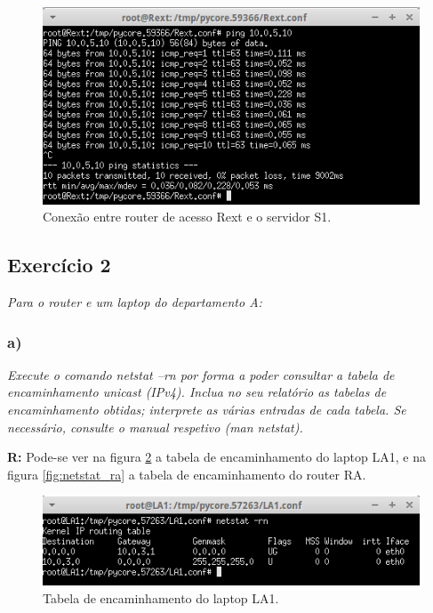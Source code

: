 \documentclass{llncs}
\begin{document}
\begin{figure}[H]
\begin{center}
\includegraphics[scale=0.50]{REXT_S1.png} 
\end{center}
\caption{\label{fig:rext_s1} Conexão entre router de acesso Rext e o servidor S1.}
\end{figure} 

\subsection{Exercício 2}
\emph{Para o router e um laptop do departamento A:}

\subsubsection{a)}
\emph{Execute o comando netstat –rn por forma a poder consultar a tabela de encaminhamento unicast (IPv4). Inclua no seu relatório as tabelas de encaminhamento obtidas; interprete as várias entradas de cada tabela. Se necessário, consulte o manual respetivo (man netstat). }
\\ \par
\textbf{R:} Pode-se ver na figura \ref{fig:netstat_la1} a tabela de encaminhamento do laptop LA1, e na figura \ref{fig:netstat_ra} a tabela de encaminhamento do router RA.

\begin{figure}[H]
\begin{center}
\includegraphics[scale=0.50]{netstat_LA1.png} 
\end{center}
\caption{\label{fig:netstat_la1} Tabela de encaminhamento do laptop LA1.}
\end{figure} 
\end{document}
